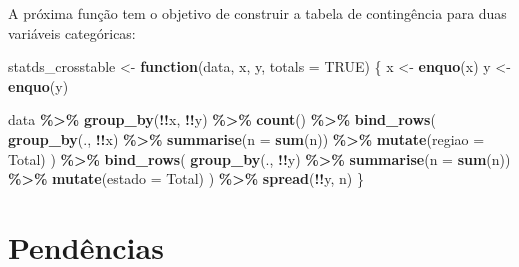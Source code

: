 \documentclass[
]{latex/krantz}
\newenvironment{Shaded}{\begin{snugshade}}{\end{snugshade}}
\newcommand{\AttributeTok}[1]{\textcolor[rgb]{0.13,0.29,0.53}{#1}}
\newcommand{\ConstantTok}[1]{\textcolor[rgb]{0.56,0.35,0.01}{#1}}
\newcommand{\ControlFlowTok}[1]{\textcolor[rgb]{0.13,0.29,0.53}{\textbf{#1}}}
\newcommand{\FunctionTok}[1]{\textcolor[rgb]{0.13,0.29,0.53}{\textbf{#1}}}
\newcommand{\NormalTok}[1]{#1}
\newcommand{\OtherTok}[1]{\textcolor[rgb]{0.56,0.35,0.01}{#1}}
\newcommand{\SpecialCharTok}[1]{\textcolor[rgb]{0.81,0.36,0.00}{\textbf{#1}}}
\newcommand{\StringTok}[1]{\textcolor[rgb]{0.31,0.60,0.02}{#1}}
\theoremstyle{definition}
\theoremstyle{definition}
\theoremstyle{definition}
\theoremstyle{definition}
\theoremstyle{remark}
\begin{document}
A próxima função tem o objetivo de construir a tabela de contingência para duas variáveis categóricas:

\begin{Shaded}
\begin{Highlighting}[]
\NormalTok{statds\_crosstable }\OtherTok{\textless{}{-}} \ControlFlowTok{function}\NormalTok{(data, x, y, }\AttributeTok{totals =} \ConstantTok{TRUE}\NormalTok{) \{}
\NormalTok{  x }\OtherTok{\textless{}{-}} \FunctionTok{enquo}\NormalTok{(x)}
\NormalTok{  y }\OtherTok{\textless{}{-}} \FunctionTok{enquo}\NormalTok{(y)}
  
\NormalTok{  data }\SpecialCharTok{\%\textgreater{}\%}
    \FunctionTok{group\_by}\NormalTok{(}\SpecialCharTok{!!}\NormalTok{x, }\SpecialCharTok{!!}\NormalTok{y) }\SpecialCharTok{\%\textgreater{}\%}
    \FunctionTok{count}\NormalTok{() }\SpecialCharTok{\%\textgreater{}\%}
    \FunctionTok{bind\_rows}\NormalTok{(}
      \FunctionTok{group\_by}\NormalTok{(., }\SpecialCharTok{!!}\NormalTok{x) }\SpecialCharTok{\%\textgreater{}\%}
        \FunctionTok{summarise}\NormalTok{(}\AttributeTok{n =} \FunctionTok{sum}\NormalTok{(n)) }\SpecialCharTok{\%\textgreater{}\%}
        \FunctionTok{mutate}\NormalTok{(}\AttributeTok{regiao =} \StringTok{\textquotesingle{}Total\textquotesingle{}}\NormalTok{)}
\NormalTok{    ) }\SpecialCharTok{\%\textgreater{}\%}
    \FunctionTok{bind\_rows}\NormalTok{(}
      \FunctionTok{group\_by}\NormalTok{(., }\SpecialCharTok{!!}\NormalTok{y) }\SpecialCharTok{\%\textgreater{}\%}
        \FunctionTok{summarise}\NormalTok{(}\AttributeTok{n =} \FunctionTok{sum}\NormalTok{(n)) }\SpecialCharTok{\%\textgreater{}\%}
        \FunctionTok{mutate}\NormalTok{(}\AttributeTok{estado =} \StringTok{\textquotesingle{}Total\textquotesingle{}}\NormalTok{)}
\NormalTok{    ) }\SpecialCharTok{\%\textgreater{}\%}
    \FunctionTok{spread}\NormalTok{(}\SpecialCharTok{!!}\NormalTok{y, n)}
\NormalTok{\}}
\end{Highlighting}
\end{Shaded}

\hypertarget{penduxeancias}{%
\section*{Pendências}\label{penduxeancias}}
\end{document}
